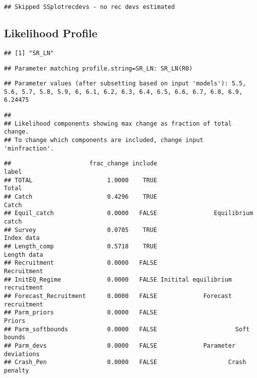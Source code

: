 \documentclass[
]{article}
\begin{document}
\begin{verbatim}
## Skipped SSplotrecdevs - no rec devs estimated
\end{verbatim}

\hypertarget{likelihood-profile}{%
\subsection{Likelihood Profile}\label{likelihood-profile}}

\begin{verbatim}
## [1] "SR_LN"
\end{verbatim}

\begin{verbatim}
## Parameter matching profile.string=SR_LN: SR_LN(R0)
\end{verbatim}

\begin{verbatim}
## Parameter values (after subsetting based on input 'models'): 5.5, 5.6, 5.7, 5.8, 5.9, 6, 6.1, 6.2, 6.3, 6.4, 6.5, 6.6, 6.7, 6.8, 6.9, 6.24475
\end{verbatim}

\begin{verbatim}
## 
## Likelihood components showing max change as fraction of total change.
## To change which components are included, change input 'minfraction'.
\end{verbatim}

\begin{verbatim}
##                      frac_change include                            label
## TOTAL                     1.0000    TRUE                            Total
## Catch                     0.4296    TRUE                            Catch
## Equil_catch               0.0000   FALSE                Equilibrium catch
## Survey                    0.0705    TRUE                       Index data
## Length_comp               0.5718    TRUE                      Length data
## Recruitment               0.0000   FALSE                      Recruitment
## InitEQ_Regime             0.0000   FALSE Initital equilibrium recruitment
## Forecast_Recruitment      0.0000   FALSE             Forecast recruitment
## Parm_priors               0.0000   FALSE                           Priors
## Parm_softbounds           0.0000   FALSE                      Soft bounds
## Parm_devs                 0.0000   FALSE             Parameter deviations
## Crash_Pen                 0.0000   FALSE                    Crash penalty
\end{verbatim}
\end{document}
